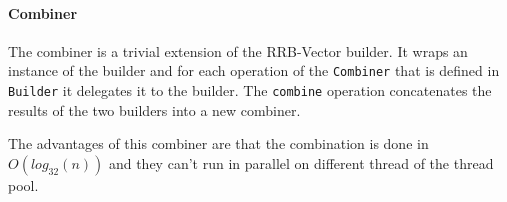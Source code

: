 \paragraph{Combiner}
The combiner is a trivial extension of the RRB-Vector builder. It wraps an instance of the builder and for each operation of the \texttt{Combiner} that is defined in \texttt{Builder} it delegates it to the builder. The \texttt{combine} operation concatenates the results of the two builders into a new combiner.

The advantages of this combiner are that the combination is done in $O(log_{32}(n))$ and they can't run in parallel on different thread of the thread pool.


